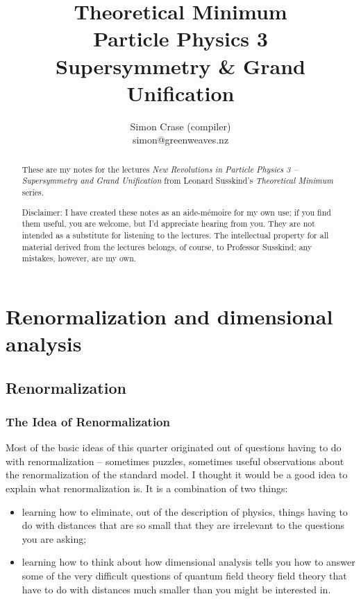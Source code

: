 \documentclass[]{article}
\title{Theoretical Minimum\\Particle Physics 3\\Supersymmetry \& Grand Unification}
\author{Simon Crase (compiler)\\simon@greenweaves.nz}
\begin{document}
\maketitle

\begin{abstract}
	These are my notes for the lectures \emph{New Revolutions in Particle Physics 3 -- Supersymmetry and Grand Unification} from Leonard Susskind's \emph{Theoretical Minimum} series\cite{susskind2007theoretical}. 
	
	Disclaimer: I have created these notes as an aide-m\'emoire for my own use; if you find them useful, you are welcome, but I'd appreciate hearing from you. They are not intended as a substitute for listening to the lectures. The intellectual property for all material derived from the lectures belongs, of course, to Professor Susskind; any mistakes, however, are my own.
	
\end{abstract}

\tableofcontents
\listoffigures
\listoftables
\listoftheorems

\section{Renormalization  and dimensional analysis}\label{sect:renormalization}

\subsection{Renormalization}

\subsubsection{The Idea of Renormalization}

Most of the basic ideas of this quarter originated out of questions having to do with renormalization -- sometimes puzzles, sometimes useful observations about the renormalization of the standard model. I thought it would be a good idea to explain what renormalization is. It  is a combination of two things:
\begin{itemize}
	\item learning how to eliminate, out of the description of physics, things having to do with distances that are so small that they are irrelevant to the questions you are asking;
	\item learning how to think about how dimensional analysis tells you how to answer some of the very difficult questions of quantum field theory field theory that have to do with distances much smaller than you might be interested in.
\end{itemize}
\end{document}
